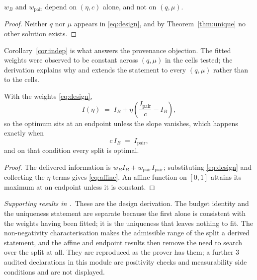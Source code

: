 \begin{corollary}
\label{cor:indep}
$w_{B}$ and $w_{\mathrm{pair}}$ depend on $(\eta,c)$ alone, and not on $(q,\mu)$.
\end{corollary}

\begin{proof}
Neither $q$ nor $\mu$ appears in \eqref{eq:design}, and by Theorem~\ref{thm:unique} no other
solution exists.
\end{proof}

Corollary~\ref{cor:indep} is what answers the provenance objection. The fitted weights were
observed to be constant across $(q,\mu)$ in the cells tested; the derivation explains why and
extends the statement to every $(q,\mu)$ rather than to the cells.



\begin{theorem}
\label{thm:affine}
With the weights \eqref{eq:design},
\begin{equation}
I(\eta)\;=\;I_{B}+\eta\left(\frac{I_{\mathrm{pair}}}{c}-I_{B}\right),
\label{eq:affine}
\end{equation}
so the optimum sits at an endpoint unless the slope vanishes, which happens exactly when
\begin{equation}
c\,I_{B}\;=\;I_{\mathrm{pair}},
\label{eq:transitioncond}
\end{equation}
and on that condition every split is optimal.
\end{theorem}

\begin{proof}
The delivered information is $w_{B}I_{B}+w_{\mathrm{pair}}I_{\mathrm{pair}}$; substituting
\eqref{eq:design} and collecting the $\eta$ terms gives \eqref{eq:affine}. An affine function
on $[0,1]$ attains its maximum at an endpoint unless it is constant.
\end{proof}


\noindent\emph{Supporting results in .}~These are the design derivation. The budget identity and the uniqueness statement are separate because the first alone is consistent with the weights having been fitted; it is the uniqueness that leaves nothing to fit. The non-negativity characterisation makes the admissible range of the split a derived statement, and the affine and endpoint results then remove the need to search over the split at all. They are reproduced as the prover has them; a further $3$ audited declarations in this module are positivity checks and measurability side conditions and are not displayed.

